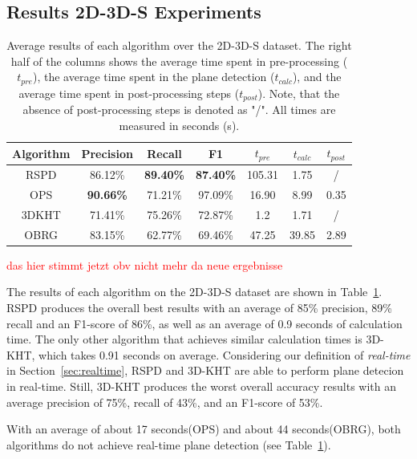 \documentclass[main.tex]{subfiles}
\begin{document}
\subsection{Results 2D-3D-S Experiments}

\begin{table}[H]
    \centering
    \begin{tabular}{c|cccccc}
        Algorithm & Precision        & Recall           & F1               & $t_{pre}$ & $t_{calc}$ & $t_{post}$ \\ \hline
        RSPD      & 86.12\%          & \textbf{89.40\%} & \textbf{87.40\%} & 105.31    & 1.75       & /          \\
        OPS       & \textbf{90.66\%} & 71.21\%          & 97.09\%          & 16.90     & 8.99       & 0.35       \\
        3DKHT     & 71.41\%          & 75.26\%          & 72.87\%          & 1.2       & 1.71       & /          \\
        OBRG      & 83.15\%          & 62.77\%          & 69.46\%          & 47.25     & 39.85      & 2.89
    \end{tabular}
    \caption[Overall 2D-3D-S Results]{Average results of each algorithm over the 2D-3D-S dataset. The right half of the columns shows the average time spent in
        pre-processing ($t_{pre}$), the average time spent in the plane detection ($t_{calc}$), and the average time spent in post-processing steps ($t_{post}$).
        Note, that the absence of post-processing steps is denoted as "/". All times are measured in seconds (s).}
    \label{tab:res-3d2ds-total}
\end{table}

\textcolor{red}{das hier stimmt jetzt obv nicht mehr da neue ergebnisse}

The results of each algorithm on the 2D-3D-S dataset are shown in Table~\ref{tab:res-3d2ds-total}.
RSPD produces the overall best results with an average of 85\% precision, 89\% recall and an F1-score of 86\%, as well as an average of 0.9 seconds of calculation time.
The only other algorithm that achieves similar calculation times is 3D-KHT, which takes 0.91 seconds on average. Considering our definition of \textit{real-time} in Section~\ref{sec:realtime},
RSPD and 3D-KHT are able to perform plane detecion in real-time. Still, 3D-KHT produces the worst overall accuracy results with an average precision of 75\%, recall of 43\%, and an F1-score of 53\%.

With an average of about 17 seconds(OPS) and about 44 seconds(OBRG), both algorithms do not achieve real-time plane detection (see Table~\ref{tab:res-3d2ds-total}).
\end{document}
